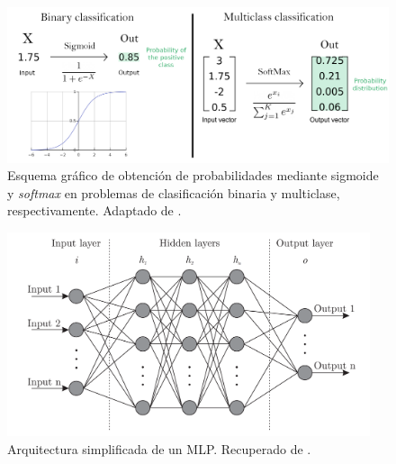 \begin{figure}[htbp]
    \centering
    \includegraphics[width=\textwidth]{capitulos/cap_02/imagenes/ActivationFuncClassification.png}
    \caption[
        Esquema gráfico de obtención de probabilidades mediante sigmoide y \textit{softmax} en problemas de clasificación binaria y multiclase. 
    ]{
        Esquema gráfico de obtención de probabilidades mediante sigmoide y \textit{softmax} en problemas de clasificación binaria y multiclase, respectivamente. 
        Adaptado de \cite{furnieles2022sigmoidandsoftmax}.
    } 
    \label{fig:activation_func_classification}
\end{figure}


\begin{figure}[htbp]
    \centering
    \includegraphics[width=0.95\textwidth]{capitulos/cap_02/imagenes/neural_network.png}
    \caption[
        Arquitectura simplificada de un MLP. 
    ]{
        Arquitectura simplificada de un \acrshort{MLP}. Recuperado de \cite{bre2017}.
    } 
    \label{fig:neural_network}
\end{figure}


